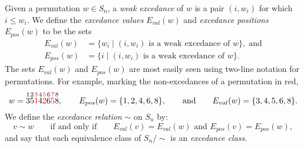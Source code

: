 \documentclass[submission]{FPSAC2024}
\theoremstyle{definition}
\theoremstyle{remark}
\numberwithin{equation}{section}
\newcommand{\EP}{E_{pos}}
\newcommand{\EV}{E_{val}}
\begin{document}
Given a permutation $w \in S_{n}$, a \emph{weak excedance} of $w$ is a pair $(i, w_{i})$ for which $i \le w_{i}$.  We define the \emph{excedance values} $\EV(w)$ and \emph{excedance positions} $\EP(w)$ to be the sets
\begin{align*}
\EV(w) &= \{ w_{i} \;|\; \text{$(i, w_{i})$ is a weak excedance of $w$}\},\;\text{and} \\[0.5em]
\EP(w) &= \{ i  \;|\; \text{$(i, w_{i})$ is a weak excedance of $w$}\}.
\end{align*}
The sets $\EV(w)$ and $\EP(w)$ are most easily seen using two-line notation for permutations.  For example, marking the non-excedances of a permutation in red,
\[
w = \overset{1}{3} \overset{2}{5} {\color{red} \overset{3}{1}} \overset{4}{4} {\color{red} \overset{5}{2}} \overset{6}{6} {\color{red} \overset{7}{5}} \overset{8}{8},
\qquad
\EP(w) = \{1, 2, 4, 6, 8\},\qquad\text{and}\qquad
\EV(w) = \{3, 4, 5, 6, 8\}.
\]
We define the \emph{excedance relation} $\sim$ on $S_{n}$ by:
\begin{equation}
\label{eq:excednacerel}
v \sim w \qquad\text{if and only if} \qquad \text{$\EV(v) = \EV(w)$ and $\EP(v) = \EP(w)$},
\end{equation}
and say that each equivalence class of $S_{n}\big/\!\!\sim$ is an \emph{excedance class}.
\end{document}
